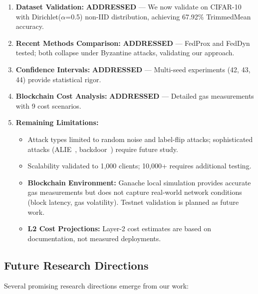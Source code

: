 \documentclass{ieeeaccess}
\begin{document}
\begin{enumerate}
    \item \textbf{Dataset Validation:} \textbf{ADDRESSED} --- We now validate on CIFAR-10 with Dirichlet($\alpha$=0.5) non-IID distribution, achieving 67.92\% TrimmedMean accuracy.
    
    \item \textbf{Recent Methods Comparison:} \textbf{ADDRESSED} --- FedProx and FedDyn tested; both collapse under Byzantine attacks, validating our approach.
    
    \item \textbf{Confidence Intervals:} \textbf{ADDRESSED} --- Multi-seed experiments (42, 43, 44) provide statistical rigor.
    
    \item \textbf{Blockchain Cost Analysis:} \textbf{ADDRESSED} --- Detailed gas measurements with 9 cost scenarios.
    
    \item \textbf{Remaining Limitations:}
    \begin{itemize}
        \item Attack types limited to random noise and label-flip attacks; sophisticated attacks (ALIE~\cite{baruch2019little}, backdoor~\cite{sun2019backdoor}) require future study.
        \item Scalability validated to 1,000 clients; 10,000+ requires additional testing.
        \item \textbf{Blockchain Environment:} Ganache local simulation provides accurate gas measurements but does not capture real-world network conditions (block latency, gas volatility). Testnet validation is planned as future work.
        \item \textbf{L2 Cost Projections:} Layer-2 cost estimates are based on documentation, not measured deployments.
    \end{itemize}
\end{enumerate}

\subsection{Future Research Directions}

Several promising research directions emerge from our work:
\end{document}
